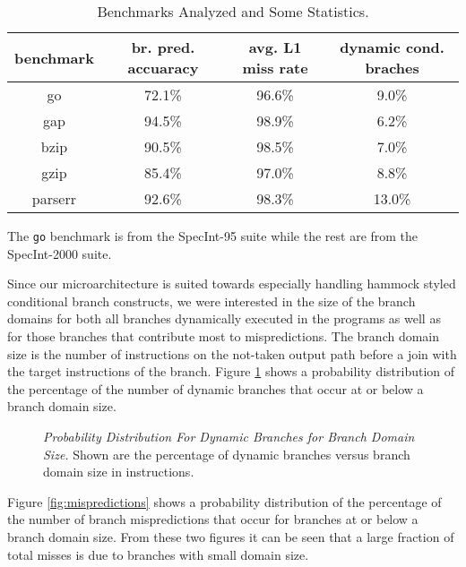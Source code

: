 \documentclass[10pt,dvips]{article}
\begin{document}
\begin{table}
\begin{center}
\caption{Benchmarks Analyzed and Some Statistics.}\label{tab:benches}
\begin{tabular}{|c|c|c|c|}
\hline 
benchmark&
br. pred. accuaracy&
avg. L1 miss rate&
dynamic cond. braches\\
\hline
\hline 
go&
72.1\%&
96.6\%&
9.0\%\\
\hline 
gap&
94.5\%&
98.9\%&
6.2\%\\
\hline 
bzip&
90.5\%&
98.5\%&
7.0\%\\
\hline 
gzip&
85.4\%&
97.0\%&
8.8\%\\
\hline 
parserr&
92.6\%&
98.3\%&
13.0\%\\
\hline
\end{tabular}
\end{center}
\end{table}

The 
{\tt go} benchmark is from the SpecInt-95 suite while the rest
are from the SpecInt-2000 suite.

Since our microarchitecture is suited towards especially handling
hammock styled conditional branch constructs, we were interested
in the size of the branch domains for both all branches
dynamically executed in the programs as well as for those branches 
that contribute most to mispredictions.  The branch domain size
is the number of instructions on the not-taken output path
before a join with the target instructions of the branch.
Figure \ref{fig:numbranches} shows a probability distribution of
the percentage of the number of dynamic branches that occur at
or below a branch domain size.  

\begin{figure}
\vspace{0.2 in}
\setlength{\epsfxsize}{10cm}%
\centerline{}
\caption{{\em Probability Distribution For Dynamic Branches for 
Branch Domain Size.} 
Shown are the percentage of dynamic branches versus branch domain size
in instructions.}
\label{fig:numbranches}
\end{figure}

Figure \ref{fig:mispredictions} shows a probability distribution of
the percentage of the number of branch mispredictions that
occur for branches at or below a branch domain size.
From these two figures it can be seen 
that a large fraction of total misses is due to branches with small domain
size. 
\end{document}
